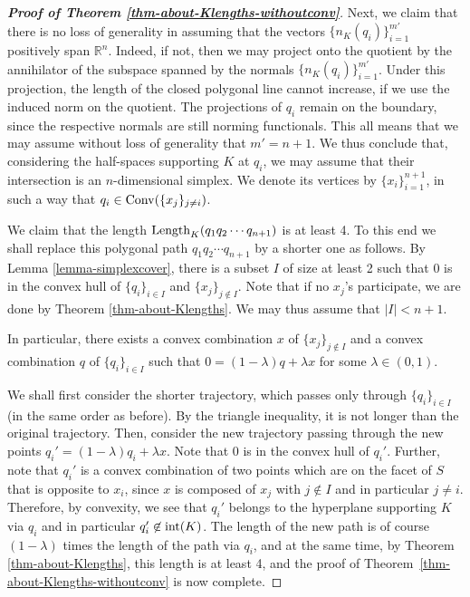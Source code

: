 \documentclass[11pt]{article}
\begin{document}
{\begin{proof}[{\bf Proof of Theorem \ref{thm-about-Klengths-withoutconv}}]
Next, we claim that there is no loss of generality in assuming that the vectors  $\{n_K(q_i)\}_{i=1}^{m'}$ positively span ${\mathbb R}^n$. Indeed, if not, then we may 
project onto the quotient by the annihilator of the subspace spanned by the normals $\{n_K(q_i)\}_{i=1}^{m'}$. Under this projection, the length of the closed polygonal line cannot increase, if we use the induced norm on the quotient. The projections of $q_i$ remain on the boundary, since the respective normals are still norming functionals. 
This all means that we may assume without loss of generality that $m'=n+1$. We thus conclude that, considering the half-spaces supporting $K$ at $q_i$, we may assume that their intersection is an $n$-dimensional simplex. We denote its vertices by $\{x_i\}_{i=1}^{n+1}$, in such a way that $q_i \in {\rm Conv}(\{x_j\}_{j\neq i})$.

We claim that the length ${\rm Length}_K(q_1q_2\cdots q_{n+1})$ is at least 4. To this end we shall replace this polygonal path $q_1q_2\cdots q_{n+1}$ by a shorter one as follows. By Lemma \ref{lemma-simplexcover}, there is a subset $I$ of size at least 2 such that $0$ is in the convex hull of $\{q_i\}_{i\in I}$ and $\{x_j\}_{j\not\in I}$. Note that if no $x_j$'s participate, we are done by Theorem \ref{thm-about-Klengths}. We may thus assume that $|I|<n+1$.

In particular, there exists a convex combination $x$ of $\{x_j\}_{j\not\in I}$ and a convex combination $q$ of $\{q_i\}_{i\in I}$ such that $0 = (1-\lambda)q+\lambda x$ for some $\lambda \in (0,1)$.
 
We shall first consider the shorter trajectory, which passes only through $\{q_i\}_{i\in I}$ (in the same order as before). By the triangle inequality, it is not longer than the original trajectory. Then, consider the new trajectory passing through the new points $q_i' = (1-\lambda)q_i + \lambda x$. Note that $0$ is in the convex hull of $q_i'$. Further, note that $q_i'$ is a convex combination of two points which are on the facet of $S$ that is opposite to $x_i$, since $x$ is composed of $x_j$ with $j\not\in I$ and in particular $j\neq i$. Therefore, by convexity, we see that $q_i'$ belongs to the hyperplane supporting $K$ via $q_i$ and in particular $q_i' \not\in \mathop{\rm int}(K)$. The length of the new path is of course $(1-\lambda)$ times the length of the path via $q_i$, and at the same time, by Theorem \ref{thm-about-Klengths}, this length is at least 4, and the proof of Theorem~\ref{thm-about-Klengths-withoutconv} is now complete.  %
\end{proof}

}
\end{document}
